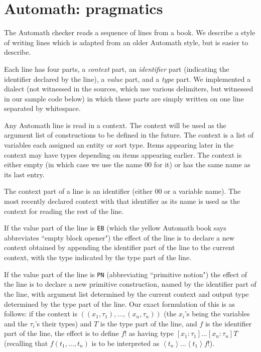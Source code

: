 \documentclass{article}
\begin{document}
\section{Automath:  pragmatics}

The Automath checker reads a sequence of lines from a book.  We describe a style of writing lines which is adapted from an older Automath style, but is easier to describe.

Each line has four parts, a {\em context\/} part, an {\em identifier\/} part (indicating the identifier declared by the line), a {\em value\/} part, and a {\em type\/} part.  We implemented a dialect (not witnessed in the sources, which use various delimiters, but witnessed in our sample code below) in which these parts are simply written on one line separated by whitespace.

Any Automath line is read in a context.  The context will be used as the argument list of constructions to be defined in the future.  The context is a list of variables each assigned an entity or sort type.  Items appearing later in the context may have types depending on items appearing earlier.  The context is either empty (in which case we use the name 00 for it) or has the same name as its last entry.

The context part of a line is an identifier (either 00 or a variable name).  The most recently declared context with that identifier as its name
is used as the context for reading the rest of the line.


If the value part of the line is {\tt EB} (which the yellow Automath book says abbreviates ``empty block opener") the effect of the line is to declare a new context obtained by appending the identifier part of the line to the current context, with the type indicated by the type part of the line.

If the value part of the line is {\tt PN} (abbreviating ``primitive notion") the effect of the line is to declare a new primitive construction, named by the identifier part of the line, with argument list determined by the current context and output type determined by the type part of the line.  Our exact formulation of this
is as follows:  if the context is $((x_1,\tau_1),\ldots,(x_n,\tau_n))$ (the $x_i$'s being the variables and the $\tau_i$'s their types) and $T$ is the type part of the line, and $f$ is the identifier part of the line, the effect is to define $f!$ as having type $[x_1:\tau_1]\ldots[x_n:\tau_n]T$ (recalling that
$f(t_1,\ldots,t_n)$ is to be interpreted as $\left<t_n\right>\ldots\left<t_1\right>f!$).
\end{document}
